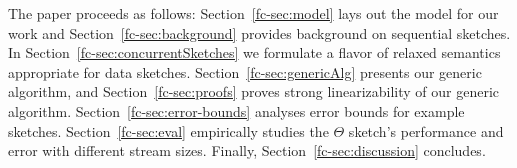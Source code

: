 The paper proceeds as follows:
Section~\ref{fc-sec:model} lays out the model for our work and Section~\ref{fc-sec:background} provides background
on sequential sketches. In Section~\ref{fc-sec:concurrentSketches} we formulate a flavor of relaxed semantics
appropriate for data sketches. Section~\ref{fc-sec:genericAlg} presents our generic algorithm, and Section~\ref{fc-sec:proofs}
proves strong linearizability of our generic algorithm. Section~\ref{fc-sec:error-bounds} analyses
error bounds for example sketches. Section~\ref{fc-sec:eval} empirically studies the $\Theta$ sketch's performance
and error with different stream sizes. Finally, Section~\ref{fc-sec:discussion}
concludes.